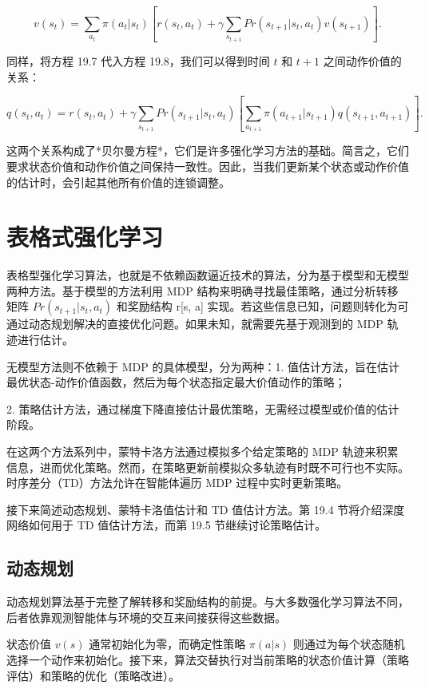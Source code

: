 \documentclass[lang=cn,newtx,10pt,scheme=chinese]{elegantbook}
\begin{document}
\begin{equation}
v(s_t) = \sum_{a_t} \pi(a_t|s_t) \left[ r(s_t, a_t) + \gamma \sum_{s_{t+1}} Pr(s_{t+1}|s_t, a_t)v(s_{t+1}) \right].  
\end{equation}

同样，将方程 19.7 代入方程 19.8，我们可以得到时间 \(t\) 和 \(t + 1\) 之间动作价值的关系：

\begin{equation}
q(s_t, a_t) = r(s_t, a_t) + \gamma \sum_{s_{t+1}} Pr(s_{t+1}|s_t, a_t) \left[ \sum_{a_{t+1}} \pi(a_{t+1}|s_{t+1})q(s_{t+1}, a_{t+1}) \right].  
\end{equation}

这两个关系构成了*贝尔曼方程*，它们是许多强化学习方法的基础。简言之，它们要求状态价值和动作价值之间保持一致性。因此，当我们更新某个状态或动作价值的估计时，会引起其他所有价值的连锁调整。

\section{表格式强化学习}
表格型强化学习算法，也就是不依赖函数逼近技术的算法，分为基于模型和无模型两种方法。基于模型的方法利用 MDP 结构来明确寻找最佳策略，通过分析转移矩阵 \(Pr(s_{t+1}|s_t,a_t)\) 和奖励结构 r[s, a] 实现。若这些信息已知，问题则转化为可通过动态规划解决的直接优化问题。如果未知，就需要先基于观测到的 MDP 轨迹进行估计。

无模型方法则不依赖于 MDP 的具体模型，分为两种：1. 值估计方法，旨在估计最优状态-动作价值函数，然后为每个状态指定最大价值动作的策略；

2. 策略估计方法，通过梯度下降直接估计最优策略，无需经过模型或价值的估计阶段。

在这两个方法系列中，蒙特卡洛方法通过模拟多个给定策略的 MDP 轨迹来积累信息，进而优化策略。然而，在策略更新前模拟众多轨迹有时既不可行也不实际。时序差分（TD）方法允许在智能体遍历 MDP 过程中实时更新策略。

接下来简述动态规划、蒙特卡洛值估计和 TD 值估计方法。第 19.4 节将介绍深度网络如何用于 TD 值估计方法，而第 19.5 节继续讨论策略估计。


\subsection{动态规划}
动态规划算法基于完整了解转移和奖励结构的前提。与大多数强化学习算法不同，后者依靠观测智能体与环境的交互来间接获得这些数据。

状态价值 \(v(s)\) 通常初始化为零，而确定性策略 \(\pi(a|s)\) 则通过为每个状态随机选择一个动作来初始化。接下来，算法交替执行对当前策略的状态价值计算（策略评估）和策略的优化（策略改进）。
\end{document}
